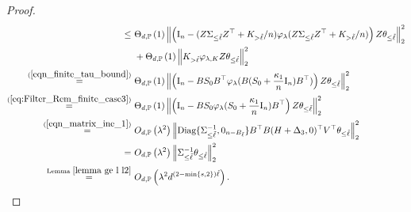 \documentclass{article}
\theoremstyle{plain}
\theoremstyle{definition}
\theoremstyle{remark}
\newcommand{\reg}{\varphi_\lambda}
\begin{document}
\begin{appendix}
\begin{proof}
\begin{equation}
\begin{aligned}
                {\leq}&~
        \Theta_{d, \mathbb{P}}\left(1\right)\left\| \left( \mathrm{I}_n - (Z\Sigma_{\leq \tilde{\ell}} Z^{\top} +K_{>\tilde{\ell}}/n) \reg(Z\Sigma_{\leq \tilde{\ell}} Z^{\top} +K_{>\tilde{\ell}}/n) \right) 
                Z\theta_{\leq \tilde{\ell}} \right\|_{2}^{2}\\
                &~+
                \Theta_{d, \mathbb{P}}\left(1\right)\left\| K_{>\tilde{\ell}} 
                \varphi_{\lambda, K}
                Z
                \theta_{\leq \tilde{\ell}} \right\|_{2}^{2}\\
                \overset{(\ref{eqn_finite_tau_bound})}{=}&~
                \Theta_{d, \mathbb{P}}\left(1\right) 
                \left\| \left( \mathrm{I}_n - B S_{0} B^{\top} \reg(B (S_{0}+ \frac{\kappa_1}{n} \mathrm{I}_n) B^{\top}) \right) 
                Z\theta_{\leq \tilde{\ell}} \right\|_{2}^{2}\\
                \overset{(\ref{eq:Filter_Rem_finite_case3})}{=}&~
                \Theta_{d, \mathbb{P}}\left(1\right) 
                \left\| \left( \mathrm{I}_n - B S_{0}  \reg( S_{0}+ \frac{\kappa_1}{n} \mathrm{I}_n ) B^{\top}\right) 
                Z\theta_{\leq \tilde{\ell}} \right\|_{2}^{2}\\
                \overset{(\ref{eqn_matrix_ine_1})}{=}&~
                O_{d, \mathbb{P}}\left(\lambda^{2}\right) 
                \left\| \text{Diag}\{\Sigma_{\leq \tilde{\ell}}^{-1}, 0_{n-B_{\tilde{\ell}}}\}
                B^{\top}B (H+\Delta_3, 0)^{\top} V^{\top}\theta_{\leq \tilde{\ell}} \right\|_{2}^{2}\\
                 =&~
                O_{d, \mathbb{P}}\left(\lambda^{2}\right)
        \left\| \Sigma_{\leq \tilde{\ell}}^{-1}
                \theta_{\leq \tilde{\ell}} \right\|_{2}^{2}\\
                \overset{\text{Lemma } \ref{lemma ge l l2}}{=} &~
                O_{d, \mathbb{P}}\left(  \lambda^{2} d^{(2-\min\{s, 2\})\tilde{\ell} }\right).
    \end{aligned}
\end{equation}
\fi


\end{proof}
\end{appendix}
\end{document}
